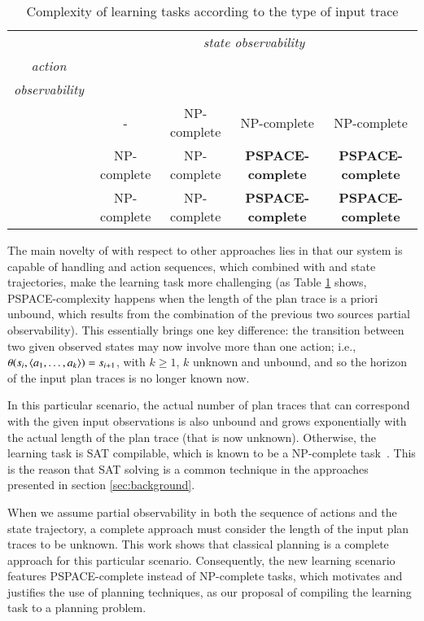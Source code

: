 \begin{table}[ht]
\centering
\begin{tabular}{c|c|c|c|c|}
	& \multicolumn{4}{c|}{\emph{state observability}} \\ \cline{2-5}
	\multirow{1}{*}{\emph{action}} & \FO & \POstar & \PO & \NO\\ {\emph{observability}} & & & & \\ \hline
	\FO & - & NP-complete & NP-complete & NP-complete \\ \hline
	\PO & NP-complete & NP-complete & \textbf{PSPACE-complete} & \textbf{PSPACE-complete} \\ \hline
	\NO & NP-complete & NP-complete & \textbf{PSPACE-complete} & \textbf{PSPACE-complete} \\ \hline
\end{tabular}
\caption{Complexity of learning tasks according to the type of input trace}
\label{tab:complex}
\end{table}

The main novelty of \FAMA with respect to other approaches lies in that our system is capable of handling \PO and \NO action sequences, which combined with \PO and \NO state trajectories, make the learning task more challenging (as Table \ref{tab:complex} shows, PSPACE-complexity happens when the length of the plan trace is a priori unbound, which results from the combination of the previous two sources partial observability).  This essentially brings one key difference: the transition between two given observed states may now involve more than one action; i.e., $\theta(s_i,{\langle a_1,\ldots,a_k \rangle})=s_{i+1}$, with $k \geq 1$, $k$ unknown and unbound, and so the horizon of the input plan traces is no longer known now.

In this particular scenario, the actual number of plan traces that can correspond with the given input observations is also unbound and grows exponentially with the actual length of the plan trace (that is now unknown). Otherwise, the learning task is SAT compilable, which is known to be a NP-complete task~\cite{russell2016artificial}. This is the reason that SAT solving is a common technique in the approaches presented in section \ref{sec:background}.

When we assume partial observability in both the sequence of actions and the state trajectory, a complete approach must consider the length of the input plan traces to be unknown. This work shows that classical planning is a complete approach for this particular scenario. Consequently, the new learning scenario features PSPACE-complete instead of NP-complete tasks, which motivates and justifies the use of planning techniques, as our proposal of compiling the learning task to a planning problem.

